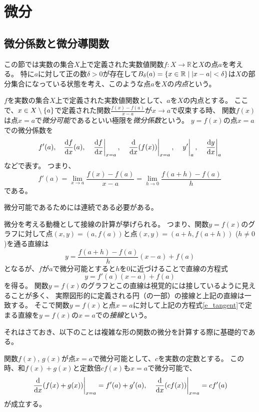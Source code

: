 
\chapter{微分}

\section{微分係数と微分導関数}

この節では実数の集合$X$上で定義された実数値関数$f: X \to \mathbb{R}$と$X$の点$a$を考える。
特に$a$に対して正の数$\delta > 0$が存在して$B_\delta(a) = \{ x \in \mathbb{R} \mid |x-a| < \delta \}$は$X$の部分集合になっている状態を考え、このような点$a$を$X$の\emph{内点}という。

\begin{definition}[微分係数]
$f$を実数の集合$X$上で定義された実数値関数として、$a$を$X$の内点とする。
ここで、$x \in X\setminus\{a\}$で定義された関数$\frac{f(x)-f(a)}{x-a}$が$x \to a$で収束する時、
関数$f(x)$は点$x = a$で\emph{微分可能}であるといい極限を\emph{微分係数}という。
$y = f(x)$の点$x = a$での微分係数を
$$
f'(a), \quad \dv{f}{x}{(a)}, \quad \eval{\dv{f}{x}}_{x = a}, \quad \eval{\dv{x}(f(x))}_{x = a}, \quad \eval{y'}_a, \quad \eval{\dv{y}{x}}_a
$$
などで表す。
つまり、
$$
f'(a) = \lim_{x \to a}\frac{f(x)-f(a)}{x-a} = \lim_{h \to 0}\frac{f(a+h)-f(a)}{h}
$$
である。
\end{definition}

\begin{remark}
微分可能であるためには連続である必要がある。
\end{remark}

微分を考える動機として接線の計算が挙げられる。
つまり、関数$y = f(x)$のグラフに対して点$(x, y) = (a, f(a))$と点$(x, y) = (a+h, f(a+h))$ ($h \ne 0$)を通る直線は
$$
y = \frac{f(a+h)-f(a)}{h}(x-a)+f(a)
$$
となるが、$f$が$a$で微分可能とすると$h$を$0$に近づけることで直線の方程式
\begin{equation}
\label{e_tangent}
y = f'(a)(x-a)+f(a)
\end{equation}
を得る。
関数$y = f(x)$のグラフとこの直線は視覚的には接しているように見えることが多く、
実際図形的に定義される円（の一部）の接線と上記の直線は一致する。
そこで関数$y = f(x)$と点$x = a$に対して上記の方程式\ref{e_tangent}で定まる直線を$y = f(x)$の$x = a$での\emph{接線}という。

それはさておき、以下のことは複雑な形の関数の微分を計算する際に基礎的である。

\begin{proposition}[和と定数倍の微分]
関数$f(x)$, $g(x)$が点$x = a$で微分可能として、$c$を実数の定数とする。
この時、和$f(x)+g(x)$と定数倍$c f(x)$も$x = a$で微分可能で、
$$
\eval{\dv{x}(f(x)+g(x))}_{x = a} = f'(a)+g'(a),
\quad \eval{\dv{x}(c f(x))}_{x = a} = c f'(a)
$$
が成立する。
\end{proposition}


